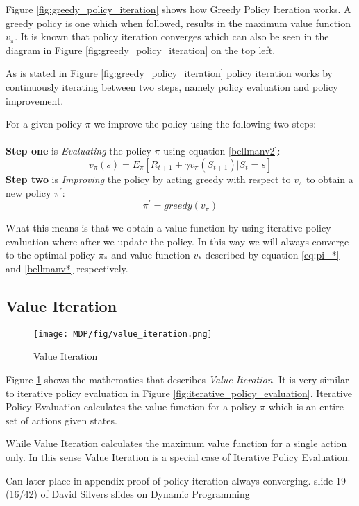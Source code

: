 Figure \ref{fig:greedy_policy_iteration} shows how Greedy Policy Iteration works. A greedy policy is one which when followed, results in the maximum value function $v_\pi$. It is known that policy iteration converges which can also be seen in the diagram in Figure \ref{fig:greedy_policy_iteration} on the top left.\cite{sutton_barto}

As is stated in Figure \ref{fig:greedy_policy_iteration} policy iteration works by continuously iterating between two steps, namely policy evaluation and policy improvement.


For a given policy $\pi$ we improve the policy using the following two steps:\\\\
\textbf{Step one} is \textit{Evaluating} the policy $\pi$ using equation \ref{bellmanv2}: \[v_{\pi}(s) = E_{\pi}[R_{t+1} + \gamma v_{\pi}(S_{t+1})|S_t = s]\]
\textbf{Step two} is \textit{Improving} the policy by acting greedy with respect to $v_\pi$ to obtain a new policy $\pi^{'}$:
\[\pi^{'} = greedy(v_{\pi})\]

What this means is that we obtain a value function by using iterative policy evaluation where after we update the policy. In this way we will always converge to the optimal policy $\pi_{*}$ and value function $v_{*}$ described by equation \ref{eq:pi_*} and \ref{bellmanv*} respectively.
\subsection{Value Iteration}
\begin{figure}[!htb]
	\centering
	\texttt{[image: MDP/fig/value\_iteration.png]}
	\caption{Value Iteration\cite{David_Silver}}
	\label{fig:value_iteration}
\end{figure}
Figure \ref{fig:value_iteration} shows the mathematics that describes \textit{Value Iteration}. It is very similar to iterative policy evaluation in Figure \ref{fig:iterative_policy_evaluation}. Iterative Policy Evaluation calculates the value function for a policy $\pi$ which is an entire set of actions given states.

While Value Iteration calculates the maximum value function for a single action only. In this sense Value Iteration is a special case of Iterative Policy Evaluation.

{\color{red} Can later place in appendix proof of policy iteration always converging. slide 19 (16/42) of David Silvers slides on Dynamic Programming}